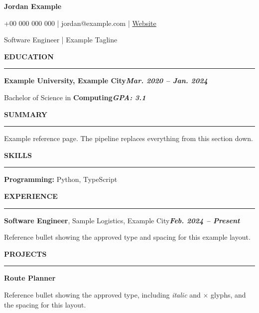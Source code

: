 \documentclass[a4paper,9pt]{extarticle}
\newcommand{\sectionline}[1]{\par\noindent\textbf{#1}\par\vspace{-8pt}\noindent\rule{\linewidth}{0.7pt}\par\vspace{-0.5pt}}
\newcommand{\titleline}[1]{\par\noindent #1\par}
\newcommand{\plainline}[1]{\par\noindent #1\par}
\newcommand{\bulletline}[1]{\par\noindent\hangindent=37pt\hangafter=1\hspace*{19pt}\makebox[18pt][l]{\textbullet}#1\par}
\begin{document}
\fontsize{9}{10.9}\selectfont
{\centering\fontsize{15}{16}\selectfont\bfseries Jordan Example\par}\vspace{3pt}
{\centering \fontsize{10}{11}\selectfont +00 000 000 000 | jordan@example.com | \href{https://example.com}{Website}\par}\vspace{2pt}
{\centering \fontsize{9}{10}\selectfont Software Engineer | Example Tagline\par}\vspace{1pt}
\sectionline{\textbf{EDUCATION}}
\titleline{\textbf{Example University, Example City}\hfill \textit{\textbf{Mar. 2020 -- Jan. 2024}}}
\titleline{Bachelor of Science in \textbf{Computing}\hfill \textit{\textbf{GPA: 3.1}}}
\sectionline{\textbf{SUMMARY}}
\plainline{Example reference page. The pipeline replaces everything from this section down.}
\sectionline{\textbf{SKILLS}}
\bulletline{\textbf{Programming:} Python, TypeScript}
\sectionline{\textbf{EXPERIENCE}}
\titleline{\textbf{Software Engineer}, Sample Logistics, Example City\hfill \textit{\textbf{Feb. 2024 -- Present}}}
\bulletline{Reference bullet showing the approved type and spacing for this example layout.}
\sectionline{\textbf{PROJECTS}}
\titleline{\textbf{Route Planner}}
\bulletline{Reference bullet showing the approved type, including \textit{italic} and $\times$ glyphs, and the spacing for this layout.}
\end{document}
